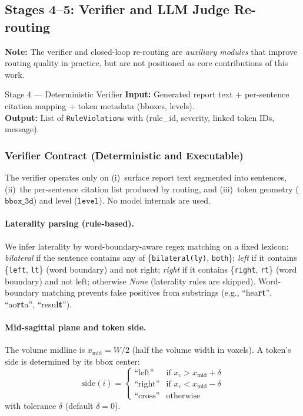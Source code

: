 \documentclass[11pt,a4paper]{article}
\begin{document}
\subsection{Stages 4--5: Verifier and LLM Judge Re-routing}
\label{sec:verifier}

\textbf{Note:} The verifier and closed-loop re-routing are \emph{auxiliary modules} that improve routing quality in practice, but are not positioned as core contributions of this work.

\begin{stagebox}{Stage 4 --- Deterministic Verifier}
\textcolor{inputcolor}{\textbf{Input:}} Generated report text + per-sentence citation mapping + token metadata (bboxes, levels).\\
\textcolor{outputcolor}{\textbf{Output:}} List of \texttt{RuleViolation}s with (rule\_id, severity, linked token IDs, message).
\end{stagebox}

\subsubsection{Verifier Contract (Deterministic and Executable)}
The verifier operates only on (i)~surface report text segmented into sentences, (ii)~the per-sentence citation list produced by routing, and (iii)~token geometry ($\texttt{bbox\_3d}$) and level ($\texttt{level}$). No model internals are used.

\paragraph{Laterality parsing (rule-based).}
We infer laterality by word-boundary-aware regex matching on a fixed lexicon:
\emph{bilateral} if the sentence contains any of \{\texttt{bilateral(ly)}, \texttt{both}\};
\emph{left} if it contains \{\texttt{left}, \texttt{lt}\} (word boundary) and not right;
\emph{right} if it contains \{\texttt{right}, \texttt{rt}\} (word boundary) and not left;
otherwise \emph{None} (laterality rules are skipped).
Word-boundary matching prevents false positives from substrings (e.g., ``hea\textbf{rt}'', ``ao\textbf{rt}a'', ``resu\textbf{lt}'').

\paragraph{Mid-sagittal plane and token side.}
The volume midline is $x_{\mathrm{mid}} = W/2$ (half the volume width in voxels).
A token's side is determined by its bbox center:
\[
\mathrm{side}(i) = \begin{cases}
\text{``left''} & \text{if } x_c > x_{\mathrm{mid}} + \delta \\
\text{``right''} & \text{if } x_c < x_{\mathrm{mid}} - \delta \\
\text{``cross''} & \text{otherwise}
\end{cases}
\]
with tolerance $\delta$ (default $\delta{=}0$).
\end{document}
